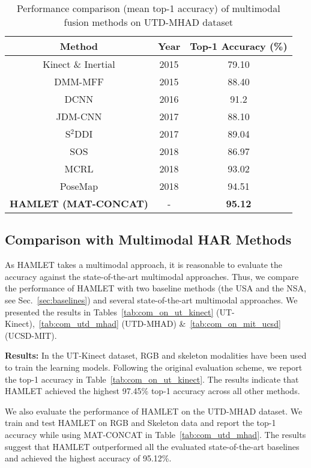 \documentclass[runningheads]{llncs}
\newcommand{\pa}{HAMLET}
\begin{document}
\begin{table}[!t]
\centering
\caption{Performance comparison (mean top-1 accuracy) of multimodal fusion methods on UTD-MHAD dataset \cite{utd_mhad}}
    \label{tab:com_utd_mhad}
\begin{tabular}{ccc}
\toprule
    Method & Year & Top-1 Accuracy (\%) \\ \hline
    Kinect \& Inertial \cite{utd_mhad} & 2015 & 79.10 \\
    DMM-MFF \cite{dmm_mff} & 2015 & 88.40 \\
    DCNN \cite{dcnn} & 2016 & 91.2\\
    JDM-CNN \cite{jdm_cnn} & 2017 & 88.10 \\
    S$^2$DDI \cite{sdd_iccv} & 2017 & 89.04 \\
    SOS \cite{sos} & 2018 & 86.97 \\
    MCRL \cite{mcrl} & 2018 & 93.02 \\
    PoseMap \cite{posemap} & 2018 & 94.51 \\ 
    \textbf{\pa{ }(MAT-CONCAT)} & - & \textbf{95.12} \\
\bottomrule
\end{tabular}
\label{tab:accuracy33}
    \vspace{-0.2in}
\end{table}


\subsection{Comparison with Multimodal HAR Methods}\label{sec:com_multimodal_har}
As {\pa } takes a multimodal approach, it is reasonable to evaluate the accuracy against the state-of-the-art multimodal approaches. Thus, we compare the performance of {\pa } with two baseline methods (the USA and the NSA, see Sec.~\ref{sec:baselines}) and several state-of-the-art multimodal approaches. We presented the results in Tables~\ref{tab:com_on_ut_kinect} (UT-Kinect),~\ref{tab:com_utd_mhad} (UTD-MHAD) \&~\ref{tab:com_on_mit_ucsd} (UCSD-MIT).




{\textbf{Results:}} In the UT-Kinect dataset, RGB and skeleton modalities have been used to train the learning models. Following the original evaluation scheme, we report the top-1 accuracy in Table~\ref{tab:com_on_ut_kinect}. The results indicate that {\pa } achieved the highest 97.45\% top-1 accuracy across all other methods.

We also evaluate the performance of {\pa } on the UTD-MHAD \cite{utd_mhad} dataset. We train and test {\pa } on RGB and Skeleton data and report the top-1 accuracy while using MAT-CONCAT in Table~\ref{tab:com_utd_mhad}. The results suggest that {\pa } outperformed all the evaluated state-of-the-art baselines and achieved the highest accuracy of 95.12\%. 
\end{document}
